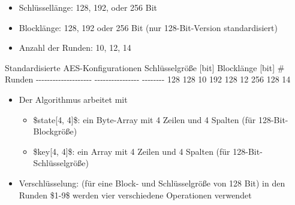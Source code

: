 \documentclass[a4paper]{article}
\begin{document}
\begin{multicols}{3}
\begin{itemize}
              \begin{itemize}
                  \item
                        Schlüssellänge: 128, 192, oder 256 Bit
                  \item
                        Blocklänge: 128, 192 oder 256 Bit (nur 128-Bit-Version
                        standardisiert)
                  \item
                        Anzahl der Runden: 10, 12, 14
              \end{itemize}
    \end{itemize}

    Standardisierte AES-Konfigurationen \textbar{} Schlüsselgröße {[}bit{]}
    \textbar{} Blocklänge {[}bit{]} \textbar{} \# Runden \textbar{}
    \textbar{} -\/-\/-\/-\/-\/-\/-\/-\/-\/-\/-\/-\/-\/-\/-\/-\/-\/-\/-\/-
    \textbar{} -\/-\/-\/-\/-\/-\/-\/-\/-\/-\/-\/-\/-\/-\/-\/- \textbar{}
    -\/-\/-\/-\/-\/-\/-\/- \textbar{} \textbar{} 128 \textbar{} 128
    \textbar{} 10 \textbar{} \textbar{} 192 \textbar{} 128 \textbar{} 12
    \textbar{} \textbar{} 256 \textbar{} 128 \textbar{} 14 \textbar{}

    \begin{itemize}
        \item
              Der Algorithmus arbeitet mit

              \begin{itemize}
                  \item
                        \$state{[}4, 4{]}\$: ein Byte-Array mit 4 Zeilen und 4 Spalten (für
                        128-Bit-Blockgröße)
                  \item
                        \$key{[}4, 4{]}\$: ein Array mit 4 Zeilen und 4 Spalten (für
                        128-Bit-Schlüsselgröße)
              \end{itemize}
        \item
              Verschlüsselung: (für eine Block- und Schlüsselgröße von 128 Bit) in
              den Runden \$1-9\$ werden vier verschiedene Operationen verwendet


\end{itemize}
\end{multicols}
\end{document}
